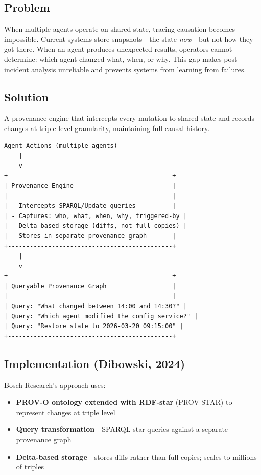 \subsection{Problem}

When multiple agents operate on shared state, tracing causation becomes impossible. Current systems store snapshots---the state \textit{now}---but not how they got there. When an agent produces unexpected results, operators cannot determine: which agent changed what, when, or why. This gap makes post-incident analysis unreliable and prevents systems from learning from failures.

\subsection{Solution}

A provenance engine that intercepts every mutation to shared state and records changes at triple-level granularity, maintaining full causal history.

\begin{lstlisting}[caption={Provenance Engine Architecture}]
Agent Actions (multiple agents)
    |
    v
+---------------------------------------------+
| Provenance Engine                           |
|                                             |
| - Intercepts SPARQL/Update queries          |
| - Captures: who, what, when, why, triggered-by |
| - Delta-based storage (diffs, not full copies) |
| - Stores in separate provenance graph       |
+---------------------------------------------+
    |
    v
+---------------------------------------------+
| Queryable Provenance Graph                  |
|                                             |
| Query: "What changed between 14:00 and 14:30?" |
| Query: "Which agent modified the config service?" |
| Query: "Restore state to 2026-03-20 09:15:00" |
+---------------------------------------------+
\end{lstlisting}

\subsection{Implementation (Dibowski, 2024)}

Bosch Research's approach uses:

\begin{itemize}
    \item \textbf{PROV-O ontology extended with RDF-star} (PROV-STAR) to represent changes at triple level
    \item \textbf{Query transformation}---SPARQL-star queries against a separate provenance graph
    \item \textbf{Delta-based storage}---stores diffs rather than full copies; scales to millions of triples
\end{itemize}

